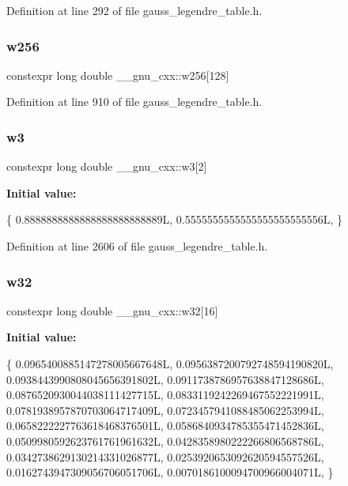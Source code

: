 Definition at line 292 of file gauss\+\_\+legendre\+\_\+table.\+h.

\mbox{\label{namespace____gnu__cxx_a1b898eb597628366c011fc46079c2f48}} 
\subsubsection{\texorpdfstring{w256}{w256}}
{\footnotesize\ttfamily constexpr long double \+\_\+\+\_\+gnu\+\_\+cxx\+::w256\mbox{[}128\mbox{]}}



Definition at line 910 of file gauss\+\_\+legendre\+\_\+table.\+h.

\mbox{\label{namespace____gnu__cxx_af8ad07ea55d0acbeba333a42dfd1c172}} 
\subsubsection{\texorpdfstring{w3}{w3}}
{\footnotesize\ttfamily constexpr long double \+\_\+\+\_\+gnu\+\_\+cxx\+::w3\mbox{[}2\mbox{]}}

{\bfseries Initial value\+:}
\begin{DoxyCode}
\{
    0.8888888888888888888888889L,
    0.5555555555555555555555556L,
  \}
\end{DoxyCode}


Definition at line 2606 of file gauss\+\_\+legendre\+\_\+table.\+h.

\mbox{\label{namespace____gnu__cxx_a50cb4dfc5cbb269dc8a2d6ef18436008}} 
\subsubsection{\texorpdfstring{w32}{w32}}
{\footnotesize\ttfamily constexpr long double \+\_\+\+\_\+gnu\+\_\+cxx\+::w32\mbox{[}16\mbox{]}}

{\bfseries Initial value\+:}
\begin{DoxyCode}
\{
    0.0965400885147278005667648L,
    0.0956387200792748594190820L,
    0.0938443990808045656391802L,
    0.0911738786957638847128686L,
    0.0876520930044038111427715L,
    0.0833119242269467552221991L,
    0.0781938957870703064717409L,
    0.0723457941088485062253994L,
    0.0658222227763618468376501L,
    0.0586840934785355471452836L,
    0.0509980592623761761961632L,
    0.0428358980222266806568786L,
    0.0342738629130214331026877L,
    0.0253920653092620594557526L,
    0.0162743947309056706051706L,
    0.0070186100094700966004071L,
  \}
\end{DoxyCode}


